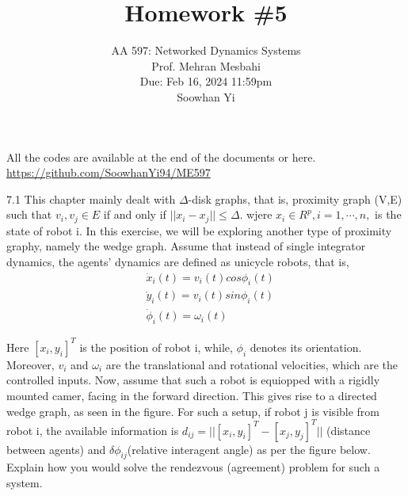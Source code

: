 \documentclass{article}
\begin{document}
\setcounter{problem}{0}
\title{Homework \#5}
\author{
    \normalsize{AA 597: Networked Dynamics Systems}\\
    \normalsize{Prof. Mehran Mesbahi}\\
    \normalsize{Due: Feb 16, 2024 11:59pm}\\
    \normalsize{Soowhan Yi}
}
\date{{}}
\maketitle

All the codes are available at the end of the documents or here.
\url{https://github.com/SoowhanYi94/ME597}
\begin{problem}7.1
    This chapter mainly dealt with $\Delta$-disk graphs, that is, proximity graph (V,E) such that ${v_i, v_j} \in E$ if and only if $||x_i - x_j|| \leq \Delta$. wjere $x_i \in R^p, i = 1, \cdots, n, $ is the state of robot i. In this exercise, we will be exploring another type of proximity graphy, namely the wedge graph. Assume that instead of single integrator dynamics, the agents' dynamics are defined as unicycle robots, that is, 
    \begin{align*}
        &\dot x_i(t) = v_i(t) cos{\phi_i (t)}\\
        &\dot y_i(t) = v_i(t) sin{\phi_i (t)}\\
        &\dot \phi_i(t)= \omega_i(t)
    \end{align*}
    
    Here $[x_i, y_i]^T$ is the position of robot i, while, $\phi_i$ denotes its orientation. Moreover, $v_i$ and $\omega_i$ are the translational and rotational velocities, which are the controlled inputs. Now, assume that such a robot is equiopped with a rigidly mounted camer, facing in the forward direction. This gives rise to a directed wedge graph, as seen in the figure. For such a setup, if robot j is visible from robot i, the available information is $d_{ij} = ||[x_i, y_i]^T - [x_j, y_j]^T||$ (distance between agents) and $\delta \phi_{ij}$(relative interagent angle) as per the figure below. Explain how you would solve the rendezvous (agreement) problem for such a system. 
    

\end{problem}
\end{document}
